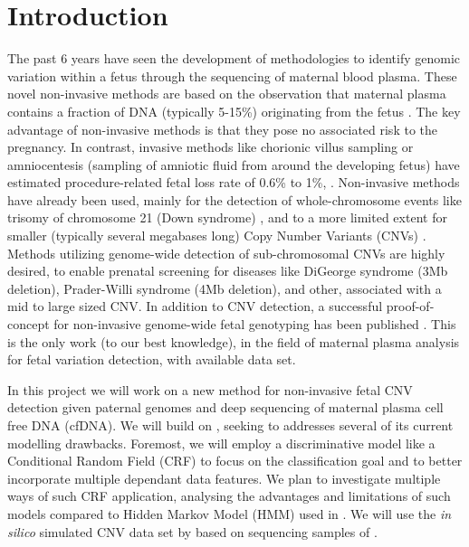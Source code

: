 \section{Introduction}

The past 6 years have seen the development of methodologies to identify genomic variation within a fetus through the sequencing of maternal blood plasma. These novel non-invasive methods are based on the observation that maternal plasma contains a fraction of DNA (typically 5-15\%) originating from the fetus \citep{lo1997presence}. The key advantage of non-invasive methods is that they pose no associated risk to the pregnancy. In contrast, invasive methods like chorionic villus sampling or amniocentesis (sampling of amniotic fluid from around the developing fetus) have estimated procedure-related fetal loss rate of 0.6\% to 1\%, \cite{douglas2007amnio}. Non-invasive methods have already been used, mainly for the detection of whole-chromosome events like trisomy of chromosome 21 (Down syndrome) \citep{chiu2008noninvasive, fan2008noninvasive}, and to a more limited extent for smaller (typically several megabases long) Copy Number Variants (CNVs) \citep{chen2013, srinivasan2013, rampasek2014fcnv}. Methods utilizing genome-wide detection of sub-chromosomal CNVs are highly desired, to enable prenatal screening for diseases like DiGeorge syndrome (\ntilde3Mb deletion), Prader-Willi syndrome (\ntilde4Mb deletion), and other, associated with a mid to large sized CNV. In addition to CNV detection, a successful proof-of-concept for non-invasive genome-wide fetal genotyping has been published \citep{kitzman2012}. This is the only work (to our best knowledge), in the field of maternal plasma analysis for fetal variation detection, with available data set.

In this project we will work on a new method for non-invasive fetal CNV detection given paternal genomes and deep sequencing of maternal plasma cell free DNA (cfDNA). We will build on \citep{rampasek2014fcnv}, seeking to addresses several of its current modelling drawbacks. Foremost, we will employ a discriminative model like a Conditional Random Field (CRF) to focus on the classification goal and to better incorporate multiple dependant data features. We plan to investigate multiple ways of such CRF application, analysing the advantages and limitations of such models compared to Hidden Markov Model (HMM) used in \citep{rampasek2014fcnv}. We will use the \textit{in silico} simulated CNV data set by \citep{rampasek2014fcnv} based on sequencing samples of \citep{kitzman2012}.

